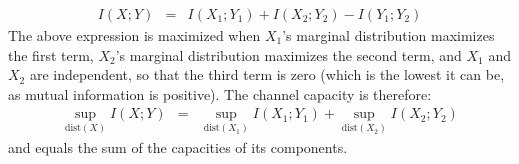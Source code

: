 \documentclass[11pt]{article} \usepackage{amssymb}
\begin{document}
\begin{enumerate}
  \begin{eqnarray*}
    I(X;Y)&=&I(X_1;Y_1)+I(X_2;Y_2)-I(Y_1;Y_2)
  \end{eqnarray*}
  The above expression is maximized when $X_1$'s marginal distribution
  maximizes the first term, $X_2$'s marginal distribution maximizes
  the second term, and $X_1$ and $X_2$ are independent, so that the third
  term is zero (which is the lowest it can be, as mutual information
  is positive). The channel capacity is therefore:
\begin{eqnarray*}
  \sup_{\mbox{dist}(X)}I(X;Y)&=&\sup_{\mbox{dist}(X_1)}I(X_1;Y_1) + \sup_{\mbox{dist}(X_2)}I(X_2;Y_2)    
\end{eqnarray*}
  and equals the sum of the capacities of its components.

\end{enumerate}
\end{document}
